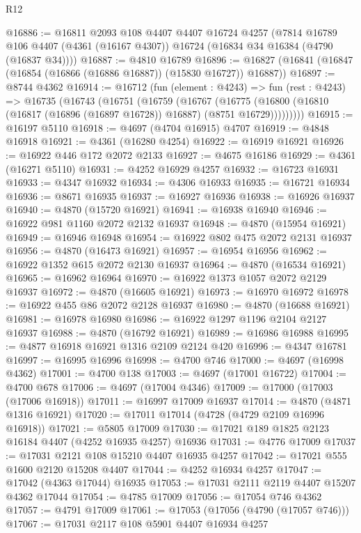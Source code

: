 \begin{lexlean}{R12}
\begin{coremodule}
@16886 := @16811
    @2093
    @108
    @4407
    @4407
    @16724
    @4257
    (@7814 @16789 @106 @4407 (@4361 (@16167 @4307)) @16724 (@16834 @34 @16384 (@4790 (@16837 @34))))
@16887 := @4810 @16789
@16896 := @16827 (@16841 (@16847 (@16854 (@16866 (@16886 @16887)) (@15830 @16727)) @16887))
@16897 := @8744 @4362
@16914 := @16712
    (fun (element : @4243) =>
    fun (rest : @4243) =>
    @16735
      (@16743
        (@16751
          (@16759
            (@16767
              (@16775
                (@16800 (@16810 (@16817 (@16896 (@16897 @16728)) @16887) (@8751 @16729)))))))))
@16915 := @16197 @5110
@16918 := @4697 (@4704 @16915) @4707
@16919 := @4848 @16918
@16921 := @4361 (@16280 @4254)
@16922 := @16919 @16921
@16926 := @16922 @446 @172 @2072 @2133
@16927 := @4675 @16186
@16929 := @4361 (@16271 @5110)
@16931 := @4252 @16929 @4257
@16932 := @16723 @16931
@16933 := @4347 @16932
@16934 := @4306 @16933
@16935 := @16721 @16934
@16936 := @8671 @16935
@16937 := @16927 @16936
@16938 := @16926 @16937
@16940 := @4870 (@15720 @16921)
@16941 := @16938 @16940
@16946 := @16922 @981 @1160 @2072 @2132 @16937
@16948 := @4870 (@15954 @16921)
@16949 := @16946 @16948
@16954 := @16922 @802 @475 @2072 @2131 @16937
@16956 := @4870 (@16473 @16921)
@16957 := @16954 @16956
@16962 := @16922 @1352 @615 @2072 @2130 @16937
@16964 := @4870 (@16534 @16921)
@16965 := @16962 @16964
@16970 := @16922 @1373 @1057 @2072 @2129 @16937
@16972 := @4870 (@16605 @16921)
@16973 := @16970 @16972
@16978 := @16922 @455 @86 @2072 @2128 @16937
@16980 := @4870 (@16688 @16921)
@16981 := @16978 @16980
@16986 := @16922 @1297 @1196 @2104 @2127 @16937
@16988 := @4870 (@16792 @16921)
@16989 := @16986 @16988
@16995 := @4877 @16918 @16921 @1316 @2109 @2124 @420
@16996 := @4347 @16781
@16997 := @16995 @16996
@16998 := @4700 @746
@17000 := @4697 (@16998 @4362)
@17001 := @4700 @138
@17003 := @4697 (@17001 @16722)
@17004 := @4700 @678
@17006 := @4697 (@17004 @4346)
@17009 := @17000 (@17003 (@17006 @16918))
@17011 := @16997 @17009 @16937
@17014 := @4870 (@4871 @1316 @16921)
@17020 := @17011 @17014 (@4728 (@4729 @2109 @16996 @16918))
@17021 := @5805 @17009
@17030 := @17021 @189 @1825 @2123 @16184 @4407 (@4252 @16935 @4257) @16936
@17031 := @4776 @17009
@17037 := @17031 @2121 @108 @15210 @4407 @16935 @4257
@17042 := @17021 @555 @1600 @2120 @15208 @4407
@17044 := @4252 @16934 @4257
@17047 := @17042 (@4363 @17044) @16935
@17053 := @17031 @2111 @2119 @4407 @15207 @4362 @17044
@17054 := @4785 @17009
@17056 := @17054 @746 @4362
@17057 := @4791 @17009
@17061 := @17053 (@17056 (@4790 (@17057 @746)))
@17067 := @17031 @2117 @108 @5901 @4407 @16934 @4257

\end{coremodule}
\end{lexlean}
